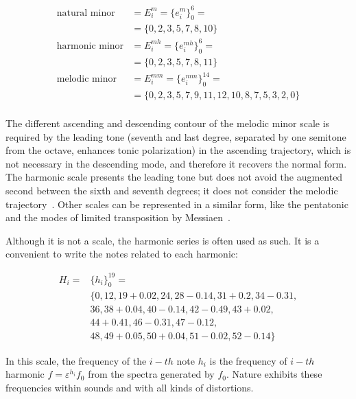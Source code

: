 \begin{equation}\label{eq:escalasMenores}
\begin{split}
\text{natural minor}&  = E_i^m = \{e_i^m\}_0^6 = \\
                                           &  = \{0,2,3,5,7,8,10\} \\
\text{harmonic minor}                      &  = E_i^{mh} = \{e_i^{mh}\}_0^6 = \\
                                           &  = \{0,2,3,5,7,8,11\} \\
\text{melodic minor}                       &  = E_i^{mm} = \{e_i^{mm}\}_0^{14} = \\
                                           &  = \{0,2,3,5,7,9,11,12,10,8,7,5,3,2,0\} \\
\end{split}
\end{equation}

The different ascending and descending contour of the melodic minor scale is required by the leading tone (seventh and last degree, separated by one semitone from the octave, enhances tonic polarization) in the ascending
 trajectory, which is not necessary in the descending mode, and therefore it recovers the normal form.
The harmonic scale presents the leading tone but does not avoid the augmented second between the sixth and seventh degrees; it does not consider the melodic trajectory~\cite{Harmonia}. 
Other scales can be represented in a similar form, like the pentatonic and the modes of limited transposition by Messiaen~\cite{Messiaen}. 

Although it is not a scale, the harmonic series is often used as such.
It is a convenient to write the notes related to each harmonic:

\begin{equation}\label{eq:serieHarmonica}
\begin{split}
H_i = & \{h_i\}_0^{19}= \\
      & \{ 0,12,19+0.02,  24,28-0.14, 31+0.2, 34-0.31, \\
                     & 36, 38+0.04,40-0.14, 42-0.49, 43+0.02, \\
                     & 44+0.41, 46-0.31, 47-0.12, \\
                     & 48, 49+0.05, 50+0.04, 51-0.02, 52-0.14   \}
\end{split}
\end{equation}

In this scale, the frequency of the $i-th$ note $h_i$ is the frequency of $i-th$ harmonic $f=\varepsilon^{h_i} f_0$ from the spectra generated by $f_0$. Nature exhibits these frequencies within sounds and with all kinds of distortions.


